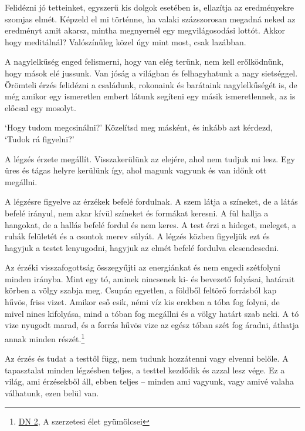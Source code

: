 \enlargethispage*{\baselineskip}

Felidézni jó tetteinket, egyszerű kis dolgok esetében is, ellazítja az
eredményekre szomjas elmét. Képzeld el mi történne, ha valaki
százszorosan megadná neked az eredményt amit akarsz, mintha megnyernél
egy megvilágosodási lottót. Akkor hogy meditálnál? Valószínűleg közel
úgy mint most, csak lazábban.

A nagylelkűség enged felismerni, hogy van elég terünk, nem kell
erőlködnünk, hogy mások elé jussunk. Van jóság a világban és
felhagyhatunk a nagy sietséggel. Örömteli érzés felidézni a családunk,
rokonaink és barátaink nagylelkűségét is, de még amikor egy ismeretlen
embert látunk segíteni egy másik ismeretlennek, az is előcsal egy
mosolyt.


`Hogy tudom megcsinálni?' Közelítsd meg másként, és inkább azt kérdezd,
`Tudok rá figyelni?'

A légzés érzete megállít. Visszakerülünk az elejére, ahol nem tudjuk mi
lesz. Egy üres és tágas helyre kerülünk így, ahol magunk vagyunk és van
időnk ott megállni.

A légzésre figyelve az érzékek befelé fordulnak. A szem látja a
színeket, de a látás befelé irányul, nem akar kívül színeket és formákat
keresni. A fül hallja a hangokat, de a hallás befelé fordul és nem
keres. A test érzi a hideget, meleget, a ruhák felületét és a csontok
merev súlyát. A légzés közben figyeljük ezt és hagyjuk a testet
lenyugodni, hagyjuk az elmét befelé fordulva elcsendesedni.

\enlargethispage*{2\baselineskip}


Az érzéki visszafogottság összegyűjti az energiánkat és nem engedi
szétfolyni minden irányba. Mint egy tó, aminek nincsenek ki- és bevezető
folyásai, határait körben a völgy szabja meg. Csupán egyetlen, a földből
feltörő forrásból kap hűvös, friss vizet. Amikor eső esik, némi víz kis
erekben a tóba fog folyni, de mivel nincs kifolyása, mind a tóban fog
megállni és a völgy határt szab neki. A tó vize nyugodt marad, és a
forrás hűvös vize az egész tóban szét fog áradni, áthatja annak minden
részét.\footnote{\href{https://a-buddha-ujja.hu/dn-2/hu/csimma-vilmos}{DN
  2}, A szerzetesi élet gyümölcsei}

Az érzés és tudat a testtől függ, nem tudunk hozzátenni vagy elvenni
belőle. A tapasztalat minden légzésben teljes, a testtel kezdődik és
azzal lesz vége. Ez a világ, ami érzésekből áll, ebben teljes -- minden
ami vagyunk, vagy amivé valaha válhatunk, ezen belül van.

